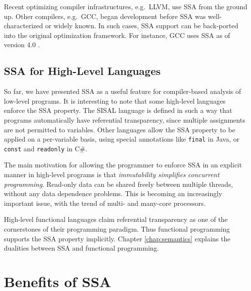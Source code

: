 Recent optimizing compiler infrastructures, e.g.\ LLVM, 
use SSA from the ground up.
Other compilers, e.g.\ GCC, began
development before SSA was well-characterized or
widely known.
In such cases, SSA support can be back-ported into 
the original optimization framework.
For instance, GCC uses SSA as of version 4.0
\cite{novillo03tree,novillo04design}.


\subsection{SSA for High-Level Languages}

So far, we have presented SSA as a useful feature for 
compiler-based analysis of low-level programs.
It is interesting to note that some high-level languages enforce
the SSA property.
The SISAL language is defined in such a way that
programs automatically have referential transparency, since
multiple assignments are not permitted to variables.
Other languages allow the SSA property to be
applied on a per-variable basis, using special annotations
like
\texttt{final} in Java, or 
\texttt{const} and \texttt{readonly} in C\#.

The main motivation for allowing the programmer to enforce
SSA in an explicit manner in high-level programs is that
\textit{immutability simplifies concurrent programming}.
Read-only data can be shared freely between multiple threads,
without any data dependence problems.
This is becoming an increasingly important issue, with the
trend of multi- and many-core processors.

High-level functional languages claim
referential transparency as one of the
cornerstones of their programming paradigm.
Thus functional programming supports the SSA property
implicitly.
Chapter \ref{chap:semantics} explains the 
dualities between SSA and functional programming.





\section{Benefits of SSA}

